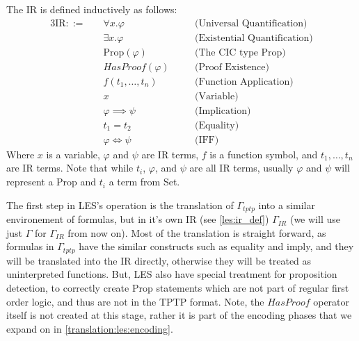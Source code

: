 \begin{definition}
\label{les:ir_def}
The IR is defined inductively as follows:
\begin{alignat*}{3}
\text{IR} ::= \quad & \forall x. \varphi && \quad\text{(Universal Quantification)} \\
             & \exists x. \varphi && \quad\text{(Existential Quantification)} \\
             & \text{Prop}(\varphi) && \quad\text{(The CIC type Prop)} \\
             & HasProof(\varphi) && \quad\text{(Proof Existence)} \\
             & f(t_1, \ldots, t_n) && \quad\text{(Function Application)} \\
             & x && \quad\text{(Variable)} \\
             & \varphi \implies \psi && \quad\text{(Implication)} \\
             & t_1 = t_2 && \quad\text{(Equality)} \\
             & \varphi \iff \psi && \quad\text{(IFF)}
\end{alignat*}
Where $x$ is a variable, $\varphi$ and $\psi$ are IR terms, $f$ is a function symbol, and $t_1, \ldots, t_n$ are IR terms.
Note that while $t_i$, $\varphi$, and $\psi$ are all IR terms, usually $\varphi$ and $\psi$ will represent a Prop and $t_i$ a term from Set.
\end{definition}

The first step in LES's operation is the translation of $\Gamma_{tptp}$ into a similar environement of formulas, but in it's own IR (see \autoref{les:ir_def}) $\Gamma_{IR}$ (we will use just $\Gamma$ for $\Gamma_{IR}$ from now on).
Most of the translation is straight forward, as formulas in $\Gamma_{tptp}$ have the similar constructs such as equality and imply, and they will be translated into the IR directly, otherwise they will be treated as uninterpreted functions. 
But, LES also have special treatment for proposition detection, to correctly create Prop statements which are not part of regular first order logic, and thus are not in the TPTP format.
Note, the $HasProof$ operator itself is not created at this stage, rather it is part of the encoding phases that we expand on in \autoref{translation:les:encoding}.

